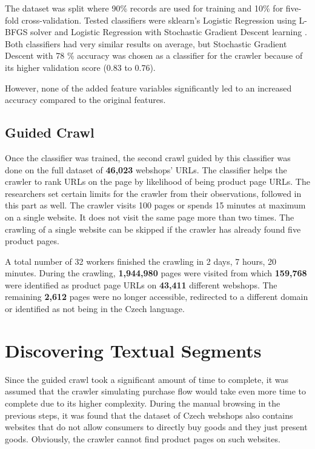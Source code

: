         The dataset was split where 90\% records are used for training and 10\% for five-fold cross-validation. Tested classifiers were sklearn's Logistic Regression using L-BFGS solver\cite{logistic-sklearn} and Logistic Regression with Stochastic Gradient Descent learning \cite{sgd-sklearn}. Both classifiers had very similar results on average, but Stochastic Gradient Descent with 78 \% accuracy was chosen as a classifier for the crawler because of its higher validation score (0.83 to 0.76).

        However, none of the added feature variables significantly led to an increased accuracy compared to the original features.

        \subsection{Guided Crawl}

        Once the classifier was trained, the second crawl guided by this classifier was done on the full dataset of \textbf{46,023} webshops' URLs. The classifier helps the crawler to rank URLs on the page by likelihood of being product page URLs. The researchers set certain limits for the crawler from their observations, followed in this part as well. The crawler visits 100 pages or spends 15 minutes at maximum on a single website. It does not visit the same page more than two times. The crawling of a single website can be skipped if the crawler has already found five product pages.

        A total number of 32 workers finished the crawling in 2 days, 7 hours, 20 minutes. During the crawling, \textbf{1,944,980} pages were visited from which \textbf{159,768} were identified as product page URLs on \textbf{43,411} different webshops. The remaining \textbf{2,612} pages were no longer accessible, redirected to a different domain or identified as not being in the Czech language.

    \section{Discovering Textual Segments}
        Since the guided crawl took a significant amount of time to complete, it was assumed that the crawler simulating purchase flow would take even more time to complete due to its higher complexity. During the manual browsing in the previous steps, it was found that the dataset of Czech webshops also contains websites that do not allow consumers to directly buy goods and they just present goods. Obviously, the crawler cannot find product pages on such websites. 


